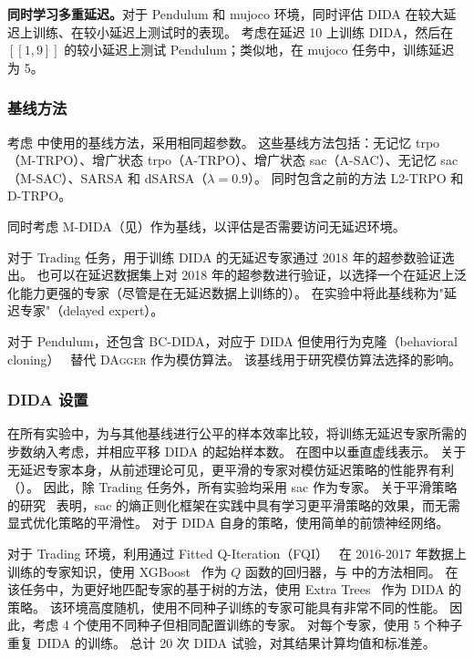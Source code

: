\noindent\textbf{同时学习多重延迟。}\indent 对于 Pendulum 和 mujoco 环境，同时评估 DIDA 在较大延迟上训练、在较小延迟上测试时的表现。
考虑在延迟 10 上训练 DIDA，然后在 $[\![1,9]\!]$ 的较小延迟上测试 Pendulum；类似地，在 mujoco 任务中，训练延迟为 5。


\subsubsection{基线方法}
考虑 中使用的基线方法，采用相同超参数。
这些基线方法包括：无记忆 \gls{trpo}（M-TRPO）、增广状态 \gls{trpo}（A-TRPO）、增广状态 \gls{sac}（A-SAC）、无记忆 \gls{sac}（M-SAC）、SARSA 和 dSARSA（$\lambda=0.9$）。
同时包含之前的方法 L2-TRPO 和 D-TRPO。

同时考虑 M-DIDA（见）作为基线，以评估是否需要访问无延迟环境。

对于 Trading 任务，用于训练 DIDA 的无延迟专家通过 2018 年的超参数验证选出。
也可以在延迟数据集上对 2018 年的超参数进行验证，以选择一个在延迟上泛化能力更强的专家（尽管是在无延迟数据上训练的）。
在实验中将此基线称为"延迟专家"（delayed expert）。

对于 Pendulum，还包含 BC-DIDA，对应于 DIDA 但使用行为克隆（behavioral cloning）~\cite{bain1995framework} 替代 \textsc{DAgger} 作为模仿算法。
该基线用于研究模仿算法选择的影响。


\subsubsection{DIDA 设置}
\label{subsubsection:our_approach_dida}
在所有实验中，为与其他基线进行公平的样本效率比较，将训练无延迟专家所需的步数纳入考虑，并相应平移 DIDA 的起始样本数。
在图中以垂直虚线表示。
关于无延迟专家本身，从前述理论可见，更平滑的专家对模仿延迟策略的性能界有利（）。
因此，除 Trading 任务外，所有实验均采用 \gls{sac} 作为专家。
关于平滑策略的研究~\cite{mysore2021regularizing} 表明，\gls{sac} 的熵正则化框架在实践中具有学习更平滑策略的效果，而无需显式优化策略的平滑性。
对于 DIDA 自身的策略，使用简单的前馈神经网络。

对于 Trading 环境，利用通过 Fitted Q-Iteration（FQI）~\cite{ernst2005tree} 在 2016-2017 年数据上训练的专家知识，使用 XGBoost~\cite{chen2016xgboost} 作为 $Q$ 函数的回归器，与 \cite{riva2022addressing} 中的方法相同。
在该任务中，为更好地匹配专家的基于树的方法，使用 Extra Trees~\cite{geurts2006extremely} 作为 DIDA 的策略。
该环境高度随机，使用不同种子训练的专家可能具有非常不同的性能。
因此，考虑 4 个使用不同种子但相同配置训练的专家。
对每个专家，使用 5 个种子重复 DIDA 的训练。
总计 20 次 DIDA 试验，对其结果计算均值和标准差。

